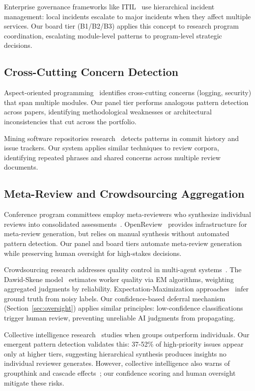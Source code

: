 Enterprise governance frameworks like ITIL~\cite{axelos2019itil} use hierarchical incident management: local incidents escalate to major incidents when they affect multiple services. Our board tier (B1/B2/B3) applies this concept to research program coordination, escalating module-level patterns to program-level strategic decisions.

\subsection{Cross-Cutting Concern Detection}

Aspect-oriented programming~\cite{kiczales1997aspect} identifies cross-cutting concerns (logging, security) that span multiple modules. Our panel tier performs analogous pattern detection across papers, identifying methodological weaknesses or architectural inconsistencies that cut across the portfolio.

Mining software repositories research~\cite{hassan2008road} detects patterns in commit history and issue trackers. Our system applies similar techniques to review corpora, identifying repeated phrases and shared concerns across multiple review documents.

\subsection{Meta-Review and Crowdsourcing Aggregation}

Conference program committees employ meta-reviewers who synthesize individual reviews into consolidated assessments~\cite{shah2018challenges}. OpenReview~\cite{soergel2013openreview} provides infrastructure for meta-review generation, but relies on manual synthesis without automated pattern detection. Our panel and board tiers automate meta-review generation while preserving human oversight for high-stakes decisions.

Crowdsourcing research addresses quality control in multi-agent systems~\cite{bernstein2015crowdsourcing}. The Dawid-Skene model~\cite{dawid1979maximum} estimates worker quality via EM algorithms, weighting aggregated judgments by reliability. Expectation-Maximization approaches~\cite{raykar2010learning} infer ground truth from noisy labels. Our confidence-based deferral mechanism (Section~\ref{sec:oversight}) applies similar principles: low-confidence classifications trigger human review, preventing unreliable AI judgments from propagating.

Collective intelligence research~\cite{woolley2010evidence,malone2010handbook} studies when groups outperform individuals. Our emergent pattern detection validates this: 37-52\% of high-priority issues appear only at higher tiers, suggesting hierarchical synthesis produces insights no individual reviewer generates. However, collective intelligence also warns of groupthink and cascade effects~\cite{lorenz2011social}; our confidence scoring and human oversight mitigate these risks.

